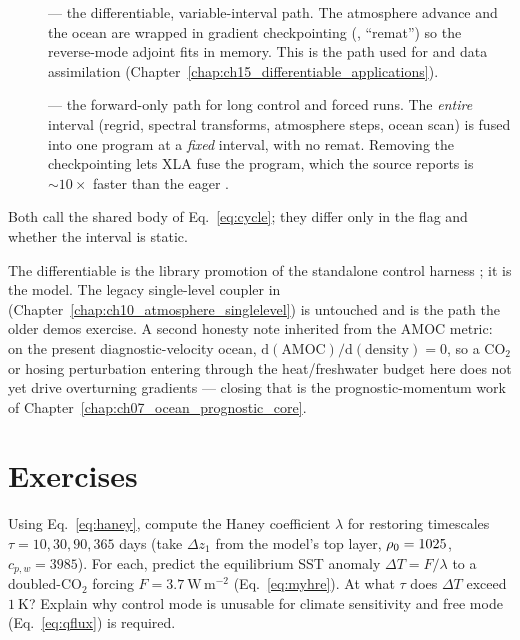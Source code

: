 \begin{description}
  \item[] --- the differentiable, variable-interval path. The
        atmosphere advance and the ocean  are wrapped in gradient
        checkpointing (, ``remat'') so the reverse-mode
        adjoint fits in memory. This is the path used for  and
        data assimilation (Chapter~\ref{chap:ch15_differentiable_applications}).
  \item[] --- the forward-only path for long control and forced
        runs. The \emph{entire} interval (regrid, spectral transforms, atmosphere
        steps, ocean scan) is fused into one  program at a
        \emph{fixed} interval, with no remat. Removing the checkpointing lets XLA
        fuse the program, which the source reports is $\sim\!10\times$ faster than
        the eager .
\end{description}

Both call the shared  body of Eq.~\eqref{eq:cycle}; they differ
only in the  flag and whether the interval is static.

\begin{remark}
The differentiable  is the library promotion of the
standalone control harness ; it is the
 model. The legacy single-level coupler in
 (Chapter~\ref{chap:ch10_atmosphere_singlelevel}) is
untouched and is the path the older  demos exercise. A second
honesty note inherited from the AMOC metric: on the present
diagnostic-velocity ocean, $\mathrm{d}(\text{AMOC})/\mathrm{d}(\text{density})=0$,
so a CO$_2$ or hosing perturbation entering through the heat/freshwater budget here
does not yet drive overturning gradients --- closing that is the prognostic-momentum
work of Chapter~\ref{chap:ch07_ocean_prognostic_core}.
\end{remark}

\section{Exercises}

\begin{exercise}
Using Eq.~\eqref{eq:haney}, compute the Haney coefficient $\lambda$ for restoring
timescales $\tau=10,30,90,365$ days (take $\Delta z_1$ from the model's top layer,
$\rho_0=1025$, $c_{p,w}=3985$). For each, predict the equilibrium SST anomaly
$\Delta T = F/\lambda$ to a doubled-CO$_2$ forcing $F=3.7\ \mathrm{W\,m^{-2}}$
(Eq.~\eqref{eq:myhre}). At what $\tau$ does $\Delta T$ exceed $1\ \mathrm{K}$?
Explain why control mode is unusable for climate sensitivity and free mode
(Eq.~\eqref{eq:qflux}) is required.
\end{exercise}

